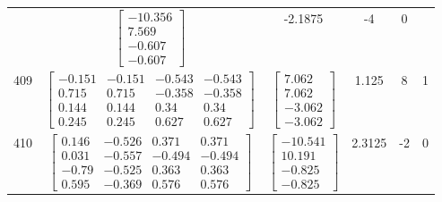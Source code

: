 \documentclass[a4paper,12pt]{article}
\begin{document}
\begin{tabular}{c c c c c c}
&
$\begin{bmatrix} -10.356 \\ 7.569 \\ -0.607 \\ -0.607 \end{bmatrix}$
&
-2.1875
&
-4
&
0
\\
409
&
$\begin{bmatrix} -0.151 & -0.151 & -0.543 & -0.543 \\ 0.715 & 0.715 & -0.358 & -0.358 \\ 0.144 & 0.144 & 0.34 & 0.34 \\ 0.245 & 0.245 & 0.627 & 0.627 \end{bmatrix}$
&
$\begin{bmatrix} 7.062 \\ 7.062 \\ -3.062 \\ -3.062 \end{bmatrix}$
&
1.125
&
8
&
1
\\
410
&
$\begin{bmatrix} 0.146 & -0.526 & 0.371 & 0.371 \\ 0.031 & -0.557 & -0.494 & -0.494 \\ -0.79 & -0.525 & 0.363 & 0.363 \\ 0.595 & -0.369 & 0.576 & 0.576 \end{bmatrix}$
&
$\begin{bmatrix} -10.541 \\ 10.191 \\ -0.825 \\ -0.825 \end{bmatrix}$
&
2.3125
&
-2
&
0
\\
\end{tabular} \egroup \newpage
\end{document}
